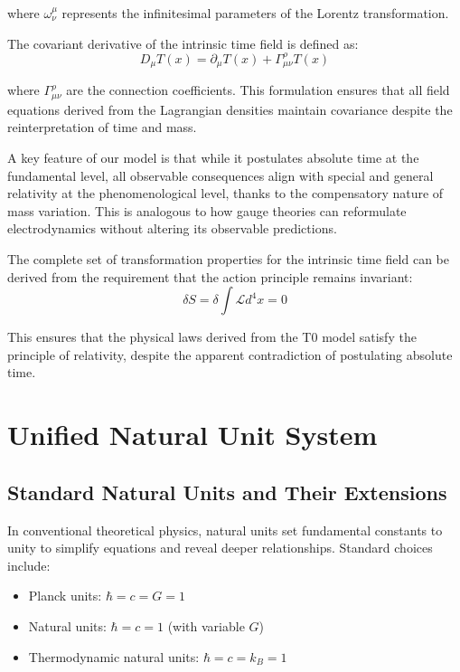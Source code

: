 \documentclass[12pt,a4paper]{article} %
\newcommand{\Tfield}{T(x)}
\begin{document}
	where $\omega_{\nu}^{\mu}$ represents the infinitesimal parameters of the Lorentz transformation.
	
	The covariant derivative of the intrinsic time field is defined as:
	\begin{equation}
		D_{\mu}\Tfield = \partial_{\mu}\Tfield + \Gamma_{\mu\nu}^{\rho}\Tfield
		\label{eq:covariant_derivative}
	\end{equation}
	
	where $\Gamma_{\mu\nu}^{\rho}$ are the connection coefficients. 
	This formulation ensures that all field equations derived from the Lagrangian densities
	maintain covariance despite the reinterpretation of time and mass.
	
	A key feature of our model is that while it postulates absolute time at the fundamental level,
	all observable consequences align with special and general relativity at the phenomenological level,
	thanks to the compensatory nature of mass variation. 
	This is analogous to how gauge theories can reformulate electrodynamics
	without altering its observable predictions.
	
	The complete set of transformation properties for the intrinsic time field
	can be derived from the requirement that the action principle remains invariant:
	\begin{equation}
		\delta S = \delta \int \mathcal{L} d^4x = 0
		\label{eq:action_invariance}
	\end{equation}
	
	This ensures that the physical laws derived from the T0 model
	satisfy the principle of relativity,
	despite the apparent contradiction of postulating absolute time.
	
	\section{Unified Natural Unit System}
	\label{sec:unified_units}
	
	\subsection{Standard Natural Units and Their Extensions}
	\label{subsec:standard_units}
	
	In conventional theoretical physics,
	natural units set fundamental constants to unity to simplify equations
	and reveal deeper relationships. 
	Standard choices include:
	\begin{itemize}
		\item Planck units: $\hbar = c = G = 1$
		\item Natural units: $\hbar = c = 1$ (with variable $G$)
		\item Thermodynamic natural units: $\hbar = c = k_B = 1$
	\end{itemize}
	
\end{document}
